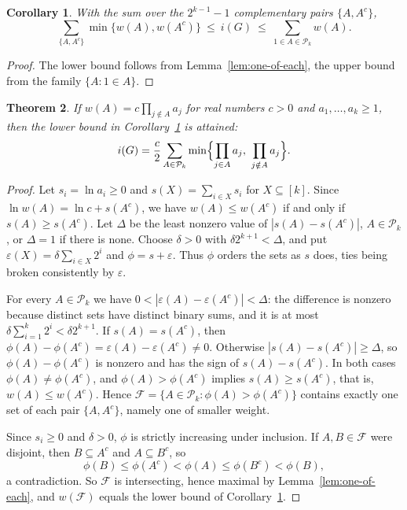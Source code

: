 \documentclass[11pt]{amsart}
\newtheorem{theorem}{Theorem}[section]
\newtheorem{corollary}[theorem]{Corollary}
\theoremstyle{definition}
\theoremstyle{remark}
\newcommand{\Pk}{\mathcal{P}_k}
\newcommand{\F}{\mathcal{F}}
\newcommand{\co}[1]{{#1}^{c}}
\begin{document}
\begin{corollary}\label{cor:i-bounds}
With the sum over the $2^{k-1}-1$ complementary pairs $\{A,\co A\}$,
\[
  \sum_{\{A,\co A\}}\min\{w(A),w(\co A)\}\ \le\ i(G)\ \le\ \sum_{1\in A\in\Pk}w(A).
\]
\end{corollary}

\begin{proof}
The lower bound follows from Lemma~\ref{lem:one-of-each}, the upper bound from the family
$\{A:1\in A\}$.
\end{proof}

\begin{theorem}\label{thm:i-closed}
If $w(A)=c\prod_{j\notin A}a_j$ for real numbers $c>0$ and $a_1,\dots,a_k\ge1$, then the lower bound in
Corollary~\ref{cor:i-bounds} is attained:
\[
 i(G)=\frac c2\sum_{A\in\Pk}\min\Bigl\{\prod_{j\in A}a_j,\ \prod_{j\notin A}a_j\Bigr\}.
\]
\end{theorem}

\begin{proof}
Let $s_i=\ln a_i\ge0$ and $s(X)=\sum_{i\in X}s_i$ for $X\subseteq[k]$. Since
$\ln w(A)=\ln c+s(\co A)$, we have $w(A)\le w(\co A)$ if and only if $s(A)\ge s(\co A)$. Let
$\Delta$ be the least nonzero value of $|s(A)-s(\co A)|$, $A\in\Pk$, or $\Delta=1$ if there is
none. Choose $\delta>0$ with $\delta2^{k+1}<\Delta$, and put $\varepsilon(X)=\delta\sum_{i\in X}2^i$
and $\phi=s+\varepsilon$. Thus $\phi$ orders the sets as $s$ does, ties being broken consistently
by $\varepsilon$.

For every $A\in\Pk$ we have $0<|\varepsilon(A)-\varepsilon(\co A)|<\Delta$: the difference is
nonzero because distinct sets have distinct binary sums, and it is at most
$\delta\sum_{i=1}^k2^i<\delta2^{k+1}$. If $s(A)=s(\co A)$, then
$\phi(A)-\phi(\co A)=\varepsilon(A)-\varepsilon(\co A)\neq0$. Otherwise
$|s(A)-s(\co A)|\ge\Delta$, so $\phi(A)-\phi(\co A)$ is nonzero and has the sign of $s(A)-s(\co A)$.
In both cases $\phi(A)\ne\phi(\co A)$, and $\phi(A)>\phi(\co A)$ implies $s(A)\ge s(\co A)$, that is,
$w(A)\le w(\co A)$. Hence $\F=\{A\in\Pk:\phi(A)>\phi(\co A)\}$ contains exactly one set of each pair
$\{A,\co A\}$, namely one of smaller weight.

Since $s_i\ge0$ and $\delta>0$, $\phi$ is strictly increasing under inclusion. If $A,B\in\F$ were
disjoint, then $B\subseteq\co A$ and $A\subseteq\co B$, so
\[
  \phi(B)\le\phi(\co A)<\phi(A)\le\phi(\co B)<\phi(B),
\]
a contradiction. So $\F$ is intersecting, hence maximal by Lemma~\ref{lem:one-of-each}, and
$w(\F)$ equals the lower bound of Corollary~\ref{cor:i-bounds}.
\end{proof}
\end{document}
